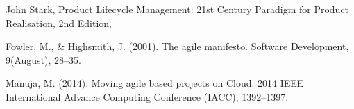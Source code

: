 \begin{thebibliography}{9}
 John Stark, Product Lifecycle Management: 21st Century Paradigm for Product Realisation, 2nd Edition,
 
 Fowler, M., \& Highsmith, J. (2001). The agile manifesto. Software Development, 9(August), 28–35. 

Manuja, M. (2014). Moving agile based projects on Cloud. 2014 IEEE International Advance Computing Conference (IACC), 1392–1397. 


\end{thebibliography}



